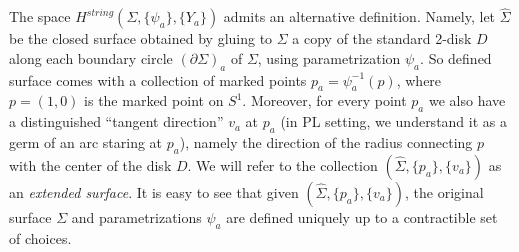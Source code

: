 \documentclass{amsart}
\theoremstyle{definition}
\theoremstyle{remark}
\numberwithin{equation}{section}
\newcommand{\del}{\partial}
\newcommand{\<}{\langle}
\renewcommand{\>}{\rangle}
\newcommand{\Si}{\Sigma}
\newcommand{\Sihat}{\widehat{\Sigma}}
\newcommand{\Hs}{H^{string}}
\begin{document}
The space $\Hs(\Si, \{\psi_a\}, \{Y_a\})$ admits an alternative definition.
Namely, let $\Sihat$ be the closed surface obtained by gluing to $\Si$ a
copy of the standard 2-disk $D$ along each boundary circle $(\del \Si)_a$
of $\Si$, using parametrization $\psi_a$. So defined surface comes with a
collection of marked points $p_a=\psi_a^{-1}(p)$, where $p=(1,0)$ is the
marked point on $S^1$. Moreover, for every  point $p_a$ we also have a
distinguished  ``tangent direction'' $v_a$ at $p_a$ (in PL setting, we
understand it as a germ of an arc staring at $p_a$), namely the direction
of the radius connecting $p$ with the center of the disk $D$. We will refer
to the collection  $(\Sihat, \{p_a\}, \{v_a\})$ as an {\em extended
surface}. It is easy to see that given  $(\Sihat, \{p_a\}, \{v_a\})$, the
original surface $\Si$ and parametrizations $\psi_a$ are defined uniquely
up to a contractible set of choices. 
\end{document}
